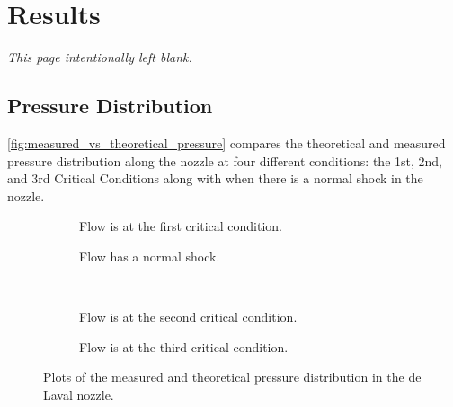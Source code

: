 \chapter{Results} \label{cp:results}

\vspace*{\fill}
\begin{center}
    \textcolor{gray!50}{\textit{This page intentionally left blank.}}
\end{center}
\vspace*{\fill}

\newpage

\section{Pressure Distribution}

\autoref{fig:measured_vs_theoretical_pressure} compares the theoretical and measured pressure distribution along the nozzle at four different conditions: the 1st, 2nd, and 3rd Critical Conditions along with when there is a normal shock in the nozzle. 

\begin{figure}[htpb]
    \centering
    \begin{subfigure}{0.49\textwidth}
        \centering
        
        \caption{Flow is at the first critical condition.}
        \label{fig:measured_vs_theoretical_pressure_1st_critical}
    \end{subfigure}
    \begin{subfigure}{0.49\textwidth}
        \centering
        
        \caption{Flow has a normal shock.}
        \label{fig:measured_vs_theoretical_pressure_normal_shock}
    \end{subfigure} \\
    \begin{subfigure}{0.49\textwidth}
        \centering
        
        \caption{Flow is at the second critical condition.}
        \label{fig:measured_vs_theoretical_pressure_2nd_critical}
    \end{subfigure}
    \begin{subfigure}{0.49\textwidth}
        \centering
        
        \caption{Flow is at the third critical condition.}
        \label{fig:measured_vs_theoretical_pressure_3rd_critical}
    \end{subfigure}
    \caption{Plots of the measured and theoretical pressure distribution in the de Laval nozzle.}
    \label{fig:measured_vs_theoretical_pressure}
\end{figure}


